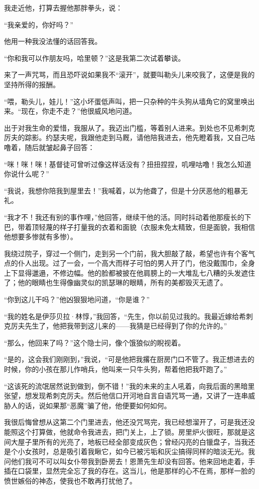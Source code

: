 {    \par 我走近他，打算去握他那胖拳头，说：
    \par “我亲爱的，你好吗？”
    \par 他用一种我没法懂的话回答我。
    \par “你和我可以作朋友吗，哈里顿？”这是我第二次试着攀谈。
    \par 来了一声咒骂，而且恐吓说如果我不“滚开”，就要叫勒头儿来咬我了，这便是我的坚持所得的报酬。
    \par “喂，勒头儿，娃儿！”这小坏蛋低声叫，把一只杂种的牛头狗从墙角它的窝里唤出来。“现在，你走不走？”他很威风地问道。
    \par 出于对我生命的爱惜，我服从了。我迈出门槛，等着别人进来。到处也不见希刺克厉夫的踪影。约瑟夫呢，我跟他走到马厩，请他陪我进去，他先瞪着我，又自己咕噜着，随后就皱起鼻子回答：
    \par “咪！咪！咪！基督徒可曾听过像这样话没有？扭扭捏捏，叽哩咕噜！我怎么知道你说什么呢？”
    \par “我说，我想你陪我到屋里去！”我喊着，以为他聋了，但是十分厌恶他的粗暴无礼。
    \par “我才不！我还有别的事作哩，”他回答，继续干他的活。同时抖动着他那瘦长的下巴，带着顶轻蔑的样子打量我的衣着和面貌（衣服未免太精致，但是面貌，我相信他想要多惨就有多惨）。
    \par 我绕过院子，穿过一个侧门，走到另一个门前，我大胆敲了敲，希望也许有个客气点的仆人出现。过了一会，一个高大而样子可怕的男人开了门，他没戴围巾，全身上下显得邋遢，不修边幅。他的脸都被披在他肩膀上的一大堆乱七八糟的头发遮住了；他的眼睛也生得像幽灵似的凯瑟琳的眼睛，所有的美都毁灭无遗了。
    \par “你到这儿干吗？”他凶狠狠地问道，“你是谁？”
    \par “我的姓名是伊莎贝拉·林惇，”我回答，“先生，你以前见过我的。我最近嫁给希刺克厉夫先生了，他把我带到这儿来的——我猜是已经得到了你的允许的。”
    \par “那么，他回来了吗？”这个隐士问，像个饿狼似的睨视着。
    \par “是的，这会我们刚刚到，”我说，“可是他把我撂在厨房门口不管了。我正想进去的时候，你的小孩在那儿作哨兵，他叫来一只牛头狗，帮着他把我吓跑了。”
    \par “这该死的流氓居然说到做到，倒不错！”我的未来的主人吼着，向我后面的黑暗里张望，想发现希刺克厉夫。然后他信口开河地自言自语咒骂一通，又讲了一连串威胁人的话，说如果那“恶魔”骗了他，他便要如何如何。
    \par 我很后悔曾想从这第二个门里进去，他还没咒骂完，我已经想溜开了，可是我还没能照这个打算做，他就命令我进去，把门关上，上了锁。房里炉火很旺，那就是这间大屋子里所有的光亮了，地板已经全部变成灰色；曾经闪亮的白镴盘子，当我还是个小女孩时，总是吸引着我瞅它，如今已被污垢和灰尘搞得同样的暗淡无光。我问他们我可不可以叫女仆带我到卧房去！恩萧先生却没有回答。他来回地走着，手插在口袋里，显然完全忘了我的存在。这当儿，他是那样的心不在焉，那样一脸的愤世嫉俗的神态，使我也不敢再打扰他了。
}
